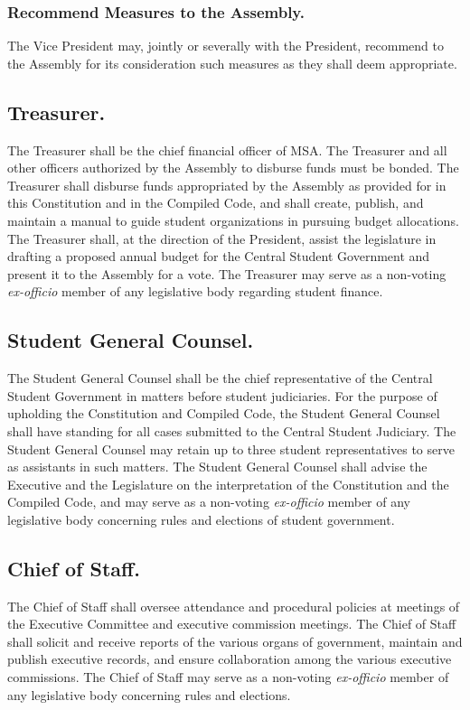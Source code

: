 \subsubsection{Recommend Measures to the Assembly.}
The Vice President may, jointly or severally with the President, recommend to the Assembly for its consideration such measures as they shall deem appropriate.


\subsection{Treasurer.}
The Treasurer shall be the chief financial officer of MSA. The Treasurer and all other officers authorized by the Assembly to disburse funds must be bonded. The Treasurer shall disburse funds appropriated by the Assembly as provided for in this Constitution and in the Compiled Code, and shall create, publish, and maintain a manual to guide student organizations in pursuing budget allocations. The Treasurer shall, at the direction of the President, assist the legislature in drafting a proposed annual budget for the Central Student Government and present it to the Assembly for a vote. The Treasurer may serve as a non-voting \textit{ex-officio} member of any legislative body regarding student finance.

\subsection{Student General Counsel.}
The Student General Counsel shall be the chief representative of the Central Student Government in matters before student judiciaries.  For the purpose of upholding the Constitution and Compiled Code, the Student General Counsel shall have standing for all cases submitted to the Central Student Judiciary.  The Student General Counsel may retain up to three student representatives to serve as assistants in such matters.  The Student General Counsel shall advise the Executive and the Legislature on the interpretation of the Constitution and the Compiled Code, and may serve as a non-voting \textit{ex-officio} member of any legislative body concerning rules and elections of student government.

\subsection{Chief of Staff.}
The Chief of Staff shall oversee attendance and procedural policies at meetings of the Executive Committee and executive commission meetings. The Chief of Staff shall solicit and receive reports of the various organs of government, maintain and publish executive records, and ensure collaboration among the various executive commissions. The Chief of Staff may serve as a non-voting \textit{ex-officio} member of any legislative body concerning rules and elections.

